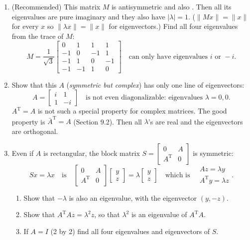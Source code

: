 \documentclass[14pt, a4paper]{article}
\begin{document}
\begin{enumerate}
    \item (Recommended) This matrix $M$ is antisymmetric and also \underline{\hspace{1cm}}. Then all its eigenvalues are pure imaginary and they also have $|\lambda| = 1$. ($\|Mx\| = \|x\|$ for every $x$ so $\|\lambda x\| = \|x\|$ for eigenvectors.) Find all four eigenvalues from the trace of $M$:
          \[
              M = \frac{1}{\sqrt{3}} \begin{bmatrix} 0 & 1 & 1 & 1 \\ -1 & 0 & -1 & 1 \\ -1 & 1 & 0 & -1 \\ -1 & -1 & 1 & 0 \end{bmatrix} \quad \text{can only have eigenvalues } i \text{ or } -i.
          \]

    \item Show that this $A$ (\textit{symmetric but complex}) has only one line of eigenvectors:
          \[
              A = \begin{bmatrix} i & 1 \\ 1 & -i \end{bmatrix} \quad \text{is not even diagonalizable: eigenvalues } \lambda = 0, 0.
          \]
          $A^{\mathrm{T}} = A$ is not such a special property for complex matrices. The good property is $\bar{A}^{\mathrm{T}} = A$ (Section 9.2). Then all $\lambda$'s are real and the eigenvectors are orthogonal.

    \item Even if $A$ is rectangular, the block matrix $S = \begin{bmatrix} 0 & A \\ A^{\mathrm{T}} & 0 \end{bmatrix}$ is symmetric:
          \[
              Sx = \lambda x \quad \text{is} \quad \begin{bmatrix} 0 & A \\ A^{\mathrm{T}} & 0 \end{bmatrix} \begin{bmatrix} y \\ z \end{bmatrix} = \lambda \begin{bmatrix} y \\ z \end{bmatrix} \quad \text{which is} \quad \begin{matrix} Az = \lambda y \\ A^{\mathrm{T}}y = \lambda z \end{matrix} .
          \]
          \begin{enumerate}
              \item Show that $-\lambda$ is also an eigenvalue, with the eigenvector $(y, -z)$.
              \item Show that $A^{\mathrm{T}}Az = \lambda^2 z$, so that $\lambda^2$ is an eigenvalue of $A^{\mathrm{T}}A$.
              \item If $A = I$ (2 by 2) find all four eigenvalues and eigenvectors of $S$.
          \end{enumerate}


\end{enumerate}
\end{document}
